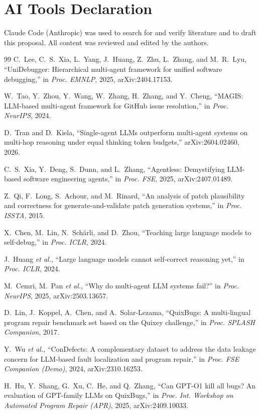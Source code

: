 \documentclass[conference]{IEEEtran}
\begin{document}
\section*{AI Tools Declaration}
Claude Code (Anthropic) was used to search for and verify literature and to
draft this proposal. All content was reviewed and edited by the authors.

\begin{thebibliography}{99}
C.~Lee, C.~S.~Xia, L.~Yang, J.~Huang, Z.~Zhu, L.~Zhang, and M.~R.~Lyu,
``UniDebugger: Hierarchical multi-agent framework for unified software
debugging,'' in \emph{Proc. EMNLP}, 2025, arXiv:2404.17153.

W.~Tao, Y.~Zhou, Y.~Wang, W.~Zhang, H.~Zhang, and Y.~Cheng, ``MAGIS: LLM-based
multi-agent framework for GitHub issue resolution,'' in \emph{Proc. NeurIPS},
2024.

D.~Tran and D.~Kiela, ``Single-agent LLMs outperform multi-agent systems on
multi-hop reasoning under equal thinking token budgets,'' arXiv:2604.02460,
2026.

C.~S.~Xia, Y.~Deng, S.~Dunn, and L.~Zhang, ``Agentless: Demystifying LLM-based
software engineering agents,'' in \emph{Proc. FSE}, 2025, arXiv:2407.01489.

Z.~Qi, F.~Long, S.~Achour, and M.~Rinard, ``An analysis of patch plausibility
and correctness for generate-and-validate patch generation systems,'' in
\emph{Proc. ISSTA}, 2015.

X.~Chen, M.~Lin, N.~Sch\"arli, and D.~Zhou, ``Teaching large language models to
self-debug,'' in \emph{Proc. ICLR}, 2024.

J.~Huang \emph{et al.}, ``Large language models cannot self-correct reasoning
yet,'' in \emph{Proc. ICLR}, 2024.

M.~Cemri, M.~Pan \emph{et al.}, ``Why do multi-agent LLM systems fail?'' in
\emph{Proc. NeurIPS}, 2025, arXiv:2503.13657.

D.~Lin, J.~Koppel, A.~Chen, and A.~Solar-Lezama, ``QuixBugs: A multi-lingual
program repair benchmark set based on the Quixey challenge,'' in \emph{Proc.
SPLASH Companion}, 2017.

Y.~Wu \emph{et al.}, ``ConDefects: A complementary dataset to address the data
leakage concern for LLM-based fault localization and program repair,'' in
\emph{Proc. FSE Companion (Demo)}, 2024, arXiv:2310.16253.

H.~Hu, Y.~Shang, G.~Xu, C.~He, and Q.~Zhang, ``Can GPT-O1 kill all bugs? An
evaluation of GPT-family LLMs on QuixBugs,'' in \emph{Proc. Int. Workshop on
Automated Program Repair (APR)}, 2025, arXiv:2409.10033.
\end{thebibliography}
\end{document}
